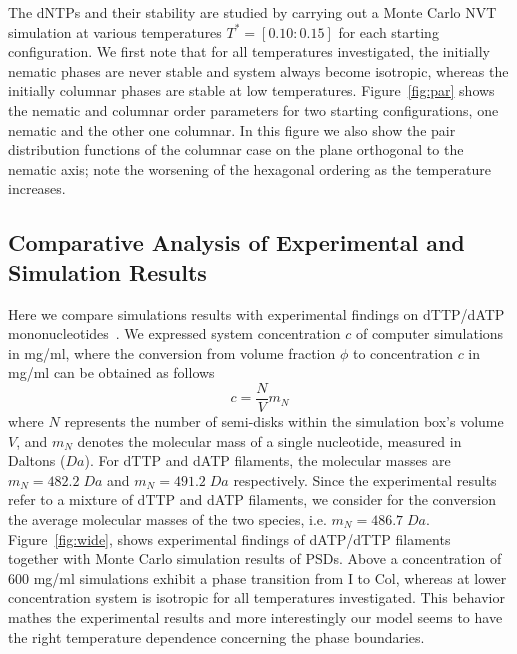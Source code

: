 \documentclass[aip,jcp, amsmath, amssymb, reprint]{revtex4-1}
\begin{document}
The dNTPs and their stability are studied by carrying out a Monte Carlo NVT simulation at various temperatures $T^*=[0.10:0.15]$
for each starting configuration. We first note that for all temperatures investigated, the initially nematic phases are never stable and system always become isotropic, whereas the initially columnar phases are stable at low temperatures.  
 Figure~\ref{fig:par} shows the nematic and columnar order parameters for two starting configurations, one nematic and the other one columnar. In this figure we also show the pair 
 distribution functions of the columnar case on the plane orthogonal to the nematic axis; note the worsening of the hexagonal ordering as the temperature increases.


\subsection{Comparative Analysis of Experimental and Simulation Results}

Here we compare simulations results with experimental findings on dTTP/dATP mononucleotides~\cite{Smith}.
We expressed system concentration $c$ of computer simulations in mg/ml, where the conversion 
from volume fraction $\phi$ to concentration $c$ in mg/ml can be obtained as follows
\begin{equation}
	c=\frac{N}{V}m_N
	\label{conc}
\end{equation}
where $N$ represents the number of semi-disks within the simulation box's volume $V$, and $m_N$ denotes the molecular mass of a single nucleotide, measured in Daltons ($Da$). For dTTP and dATP filaments, the molecular masses are $m_N=482.2\; Da$ and $m_N=491.2\; Da$ respectively. Since the experimental results refer to a mixture of dTTP and dATP filaments, we consider for
the conversion the average molecular masses of the two species, i.e. $m_N=486.7\; Da$. 
Figure~\ref{fig:wide}, shows experimental 
findings of dATP/dTTP filaments~\cite{Smith} together with Monte Carlo simulation results of PSDs. 
Above a concentration of 600 mg/ml simulations exhibit a phase transition from I to Col, whereas at lower concentration
system is isotropic for all temperatures investigated. This behavior mathes the experimental results and more interestingly
our model seems to have the right temperature dependence concerning the phase boundaries.
\end{document}
